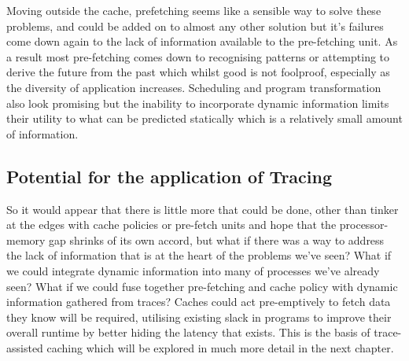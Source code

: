 Moving outside the cache, prefetching seems like a sensible way to solve these problems, and could be added on to almost any other solution but it's failures come down again to the lack of information available to the pre-fetching unit. As a result most pre-fetching comes down to recognising patterns or attempting to derive the future from the past which whilst good is not foolproof, especially as the diversity of application increases. Scheduling and program transformation also look promising but the inability to incorporate dynamic information limits their utility to what can be predicted statically which is a relatively small amount of information. 

\subsection{Potential for the application of Tracing}

So it would appear that there is little more that could be done, other than tinker at the edges with cache policies or pre-fetch units and hope that the processor-memory gap shrinks of its own accord, but what if there was a way to address the lack of information that is at the heart of the problems we've seen? What if we could integrate dynamic information into many of processes we've already seen? What if we could fuse together pre-fetching and cache policy with dynamic information gathered from traces? Caches could act pre-emptively to fetch data they know will be required, utilising existing slack in programs to improve their overall runtime by better hiding the latency that exists. This is the basis of trace-assisted caching which will be explored in much more detail in the next chapter. 

